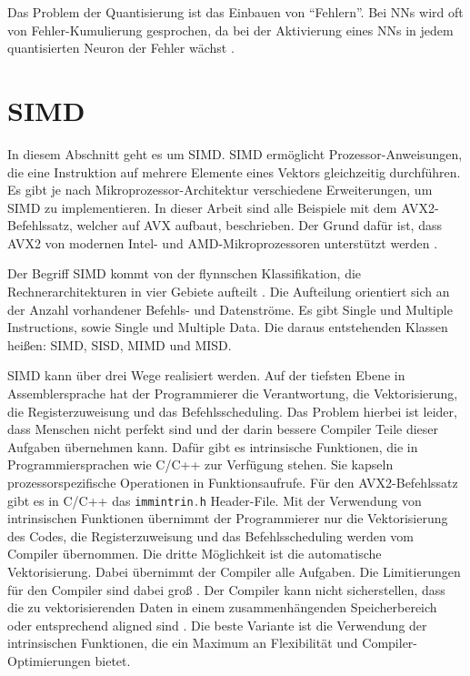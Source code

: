 Das Problem der Quantisierung ist das Einbauen von \enquote{Fehlern}. Bei \acp{NN} wird oft von Fehler-Kumulierung gesprochen, da bei der Aktivierung eines \acp{NN} in jedem quantisierten Neuron der Fehler wächst \cite{Park2018}.

\section{SIMD}

In diesem Abschnitt geht es um \ac{SIMD}. \ac{SIMD} ermöglicht Prozessor-Anweisungen, die eine Instruktion auf mehrere Elemente eines Vektors gleichzeitig durchführen. Es gibt je nach Mikroprozessor-Architektur verschiedene Erweiterungen, um \ac{SIMD} zu implementieren. In dieser Arbeit sind alle Beispiele mit dem \ac{AVX2}-Befehlssatz, welcher auf \ac{AVX} aufbaut, beschrieben. Der Grund dafür ist, dass \ac{AVX2} von modernen Intel- und AMD-Mikroprozessoren unterstützt werden \cite[S. 117]{fog2006optimizing}.

Der Begriff \ac{SIMD} kommt von der flynnschen Klassifikation, die Rechnerarchitekturen in vier Gebiete aufteilt \cite{Flynn1972}. Die Aufteilung orientiert sich an der Anzahl vorhandener Befehls- und Datenströme. Es gibt Single und Multiple Instructions, sowie Single und Multiple Data. Die daraus entstehenden Klassen heißen: \ac{SIMD}, \ac{SISD}, \ac{MIMD} und \ac{MISD}.

\ac{SIMD} kann über drei Wege realisiert werden. Auf der tiefsten Ebene in Assemblersprache hat der Programmierer die Verantwortung, die Vektorisierung, die Registerzuweisung und das Befehlsscheduling. Das Problem hierbei ist leider, dass Menschen nicht perfekt sind und der darin bessere Compiler Teile dieser Aufgaben übernehmen kann. Dafür gibt es intrinsische Funktionen, die in Programmiersprachen wie C/C++ zur Verfügung stehen. Sie kapseln prozessorspezifische Operationen in Funktionsaufrufe. Für den \ac{AVX2}-Befehlssatz gibt es in C/C++ das \lstinline[language=C++]{immintrin.h} Header-File. Mit der Verwendung von intrinsischen Funktionen übernimmt der Programmierer nur die Vektorisierung des Codes, die Registerzuweisung und das Befehlsscheduling werden vom Compiler übernommen. Die dritte Möglichkeit ist die automatische Vektorisierung. Dabei übernimmt der Compiler alle Aufgaben. Die Limitierungen für den Compiler sind dabei groß \cite{ren2003preliminary}. Der Compiler kann nicht sicherstellen, dass die zu vektorisierenden Daten in einem zusammenhängenden Speicherbereich oder entsprechend aligned sind \cite[S. 118-120]{fog2006optimizing}. Die beste Variante ist die Verwendung der intrinsischen Funktionen, die ein Maximum an Flexibilität und Compiler-Optimierungen bietet.

